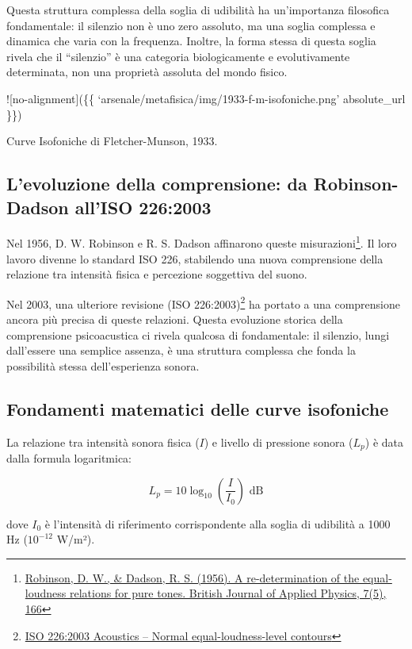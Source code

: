 \documentclass[a4paper,11pt]{article}
\begin{document}
Questa struttura complessa della soglia di udibilità ha un'importanza
filosofica fondamentale: il silenzio non è uno zero assoluto, ma una
soglia complessa e dinamica che varia con la frequenza. Inoltre, la
forma stessa di questa soglia rivela che il ``silenzio'' è una categoria
biologicamente e evolutivamente determinata, non una proprietà assoluta
del mondo fisico.

!{[}no-alignment{]}(\{\{
`arsenale/metafisica/img/1933-f-m-isofoniche.png' \textbar{}
absolute\_url \}\})

Curve Isofoniche di Fletcher-Munson, 1933.

\subsection{L'evoluzione della comprensione: da Robinson-Dadson all'ISO
226:2003}\label{levoluzione-della-comprensione-da-robinson-dadson-alliso-2262003}

Nel 1956, D. W. Robinson e R. S. Dadson affinarono queste
misurazioni\footnote{\href{https://doi.org/10.1121/1.1919119}{Robinson,
  D. W., \& Dadson, R. S. (1956). A re-determination of the
  equal-loudness relations for pure tones. British Journal of Applied
  Physics, 7(5), 166}}. Il loro lavoro divenne lo standard ISO 226,
stabilendo una nuova comprensione della relazione tra intensità fisica e
percezione soggettiva del suono.

Nel 2003, una ulteriore revisione (ISO 226:2003)\footnote{\href{https://www.iso.org/standard/34222.html}{ISO
  226:2003 Acoustics -- Normal equal-loudness-level contours}} ha
portato a una comprensione ancora più precisa di queste relazioni.
Questa evoluzione storica della comprensione psicoacustica ci rivela
qualcosa di fondamentale: il silenzio, lungi dall'essere una semplice
assenza, è una struttura complessa che fonda la possibilità stessa
dell'esperienza sonora.

\subsection{Fondamenti matematici delle curve
isofoniche}\label{fondamenti-matematici-delle-curve-isofoniche}

La relazione tra intensità sonora fisica (\(I\)) e livello di pressione
sonora (\(L_p\)) è data dalla formula logaritmica:

\[L_p = 10 \log_{10}\left(\frac{I}{I_0}\right) \text{ dB}\]

dove \(I_0\) è l'intensità di riferimento corrispondente alla soglia di
udibilità a 1000 Hz (\(10^{-12}\) W/m²).
\end{document}
